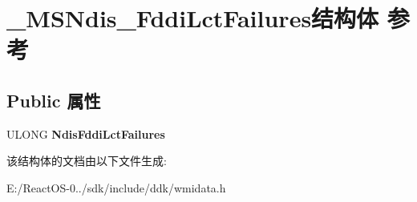 \hypertarget{struct___m_s_ndis___fddi_lct_failures}{}\section{\+\_\+\+M\+S\+Ndis\+\_\+\+Fddi\+Lct\+Failures结构体 参考}
\label{struct___m_s_ndis___fddi_lct_failures}
\subsection*{Public 属性}
\begin{DoxyCompactItemize}
\item 
\mbox{\label{struct___m_s_ndis___fddi_lct_failures_aeaae5028ae051ec00cb28ab2a46fb43c}} 
U\+L\+O\+NG {\bfseries Ndis\+Fddi\+Lct\+Failures}
\end{DoxyCompactItemize}


该结构体的文档由以下文件生成\+:\begin{DoxyCompactItemize}
\item 
E\+:/\+React\+O\+S-\/0../sdk/include/ddk/wmidata.\+h\end{DoxyCompactItemize}
